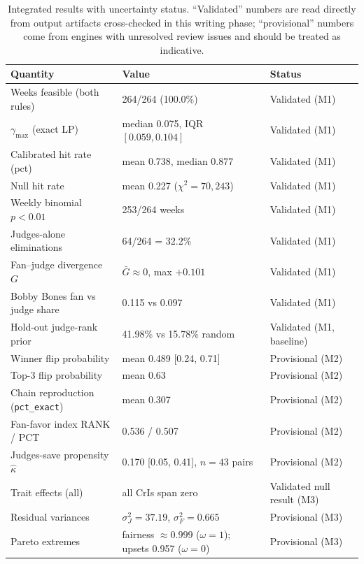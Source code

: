 \documentclass[11pt]{article}
\begin{document}
\begin{table}[H]
\centering
\small
\caption{Integrated results with uncertainty status. ``Validated'' numbers are read
directly from output artifacts cross-checked in this writing phase; ``provisional''
numbers come from engines with unresolved review issues and should be treated as
indicative.}
\label{tab:integrated}
\begin{tabular}{lll}
\toprule
Quantity & Value & Status \\
\midrule
Weeks feasible (both rules) & 264/264 (100.0\%) & Validated (M1) \\
$\gamma_{\max}$ (exact LP) & median 0.075, IQR $[0.059, 0.104]$ & Validated (M1) \\
Calibrated hit rate (pct) & mean 0.738, median 0.877 & Validated (M1) \\
Null hit rate & mean 0.227 ($\chi^2 = 70{,}243$) & Validated (M1) \\
Weekly binomial $p<0.01$ & 253/264 weeks & Validated (M1) \\
Judges-alone eliminations & 64/264 = 32.2\% & Validated (M1) \\
Fan--judge divergence $G$ & $\bar G \approx 0$, max $+0.101$ & Validated (M1) \\
Bobby Bones fan vs judge share & 0.115 vs 0.097 & Validated (M1) \\
Hold-out judge-rank prior & 41.98\% vs 15.78\% random & Validated (M1, baseline) \\
Winner flip probability & mean 0.489 [0.24, 0.71] & Provisional (M2) \\
Top-3 flip probability & mean 0.63 & Provisional (M2) \\
Chain reproduction (\texttt{pct\_exact}) & mean 0.307 & Provisional (M2) \\
Fan-favor index RANK / PCT & 0.536 / 0.507 & Provisional (M2) \\
Judges-save propensity $\hat\kappa$ & 0.170 [0.05, 0.41], $n=43$ pairs & Provisional (M2) \\
Trait effects (all) & all CrIs span zero & Validated null result (M3) \\
Residual variances & $\sigma^2_J = 37.19$, $\sigma^2_F = 0.665$ & Provisional (M3) \\
Pareto extremes & fairness $\approx 0.999$ ($\omega{=}1$); upsets 0.957 ($\omega{=}0$) & Provisional (M3) \\
\bottomrule
\end{tabular}
\end{table}
\end{document}
